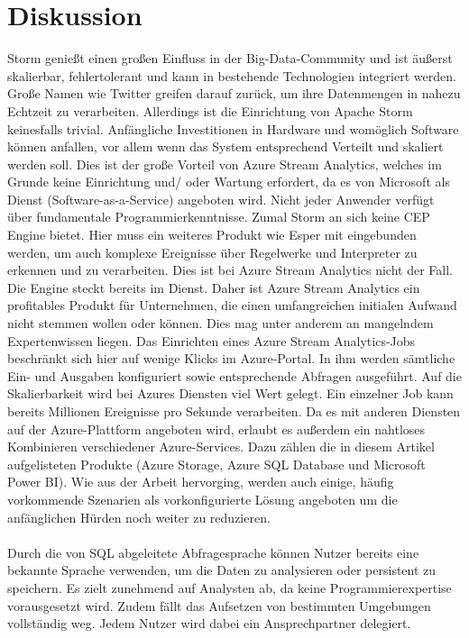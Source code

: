 \section{Diskussion}
Storm genießt einen großen Einfluss in der Big-Data-Community und ist äußerst skalierbar, fehlertolerant und kann in bestehende Technologien integriert werden. Große Namen wie Twitter greifen darauf zurück, um ihre Datenmengen in nahezu Echtzeit zu verarbeiten. Allerdings ist die Einrichtung von Apache Storm keinesfalls trivial. Anfängliche Investitionen in Hardware und womöglich Software können anfallen, vor allem wenn das System entsprechend Verteilt und skaliert werden soll. Dies ist der große Vorteil von Azure Stream Analytics, welches im Grunde keine Einrichtung und/ oder Wartung erfordert, da es von Microsoft als Dienst (Software-as-a-Service) angeboten wird. Nicht jeder Anwender verfügt über fundamentale Programmierkenntnisse. Zumal Storm an sich keine CEP Engine bietet. Hier muss ein weiteres Produkt wie Esper mit eingebunden werden, um auch komplexe Ereignisse über Regelwerke und Interpreter zu erkennen und zu verarbeiten. Dies ist bei Azure Stream Analytics nicht der Fall. Die Engine steckt bereits im Dienst. Daher ist Azure Stream Analytics ein profitables Produkt für Unternehmen, die einen umfangreichen initialen Aufwand nicht stemmen wollen oder können. Dies mag unter anderem an mangelndem Expertenwissen liegen. Das Einrichten eines Azure Stream Analytics-Jobs beschränkt sich hier auf wenige Klicks im Azure-Portal. In ihm werden sämtliche Ein- und Ausgaben konfiguriert sowie entsprechende Abfragen ausgeführt. Auf die Skalierbarkeit wird bei Azures Diensten viel Wert gelegt. Ein einzelner Job kann bereits Millionen Ereignisse pro Sekunde verarbeiten. Da es mit anderen Diensten auf der Azure-Plattform angeboten wird, erlaubt es außerdem ein nahtloses Kombinieren verschiedener Azure-Services. Dazu zählen die in diesem Artikel aufgelisteten Produkte (Azure Storage, Azure SQL Database und Microsoft Power BI). Wie aus der Arbeit hervorging, werden auch einige, häufig vorkommende Szenarien als vorkonfigurierte Lösung angeboten um die anfänglichen Hürden noch weiter zu reduzieren.\\ \\
Durch die von SQL abgeleitete Abfragesprache können Nutzer bereits eine bekannte Sprache verwenden, um die Daten zu analysieren oder persistent zu speichern. Es zielt zunehmend auf Analysten ab, da keine Programmierexpertise vorausgesetzt wird. Zudem fällt das Aufsetzen von bestimmten Umgebungen vollständig weg. Jedem Nutzer wird dabei ein Ansprechpartner delegiert.\\ \\
